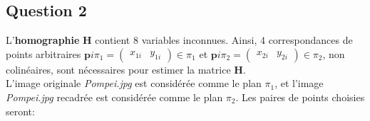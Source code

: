 \documentclass[../CSC_5RO17_TA_TP1.tex]{subfiles}
\begin{document}
\subsection{Question 2}
\noindent L'\textbf{homographie} $\mathbf{H}$ contient 8 variables inconnues. Ainsi, 4 correspondances de points arbitraires $\mathbf{p}{i{\pi_1}} = \begin{pmatrix}x_{1i} & y_{1i}\end{pmatrix} \in \pi_1$ et $\mathbf{p}{i{\pi_2}} = \begin{pmatrix}x_{2i} & y_{2i}\end{pmatrix} \in \pi_2$, non colinéaires, sont nécessaires pour estimer la matrice $\mathbf{H}$.\\

\noindent L'image originale \textit{Pompei.jpg} est considérée comme le plan $\pi_1$, et l'image \textit{Pompei.jpg} recadrée est considérée comme le plan $\pi_2$. Les paires de points choisies seront:
\end{document}
